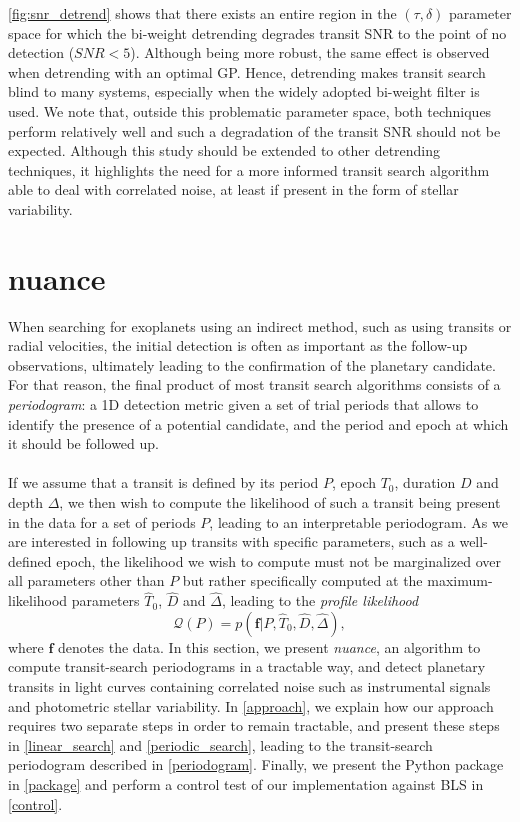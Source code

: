 \documentclass[modern]{aastex631}
\begin{document}
\autoref{fig:snr_detrend} shows that there exists an entire region in the $(\tau, \delta)$ parameter space for which the bi-weight detrending degrades transit SNR to the point of no detection ($SNR < 5$). Although being more robust, the same effect is observed when detrending with an optimal GP. Hence, detrending makes transit search blind to many systems, especially when the widely adopted bi-weight filter is used. We note that, outside this problematic parameter space, both techniques perform relatively well and such a degradation of the transit SNR should not be expected. Although this study should be extended to other detrending techniques, it highlights the need for a more informed transit search algorithm able to deal with correlated noise, at least if present in the form of stellar variability.

\newpage
\section{\textsf{nuance}}\label{nuance}
When searching for exoplanets using an indirect method, such as using transits or radial velocities, the initial detection is often as important as the follow-up observations, ultimately leading to the confirmation of the planetary candidate. For that reason, the final product of most transit search algorithms consists of a \textit{periodogram}: a 1D detection metric given a set of trial periods that allows to identify the presence of a potential candidate, and the period and epoch at which it should be followed up.\\\\ 
If we assume that a transit is defined by its period $P$, epoch $T_0$, duration $D$ and depth $\Delta$, we then wish to compute the likelihood of such a transit being present in the data for a set of periods $P$, leading to an interpretable periodogram. As we are interested in following up transits with specific parameters, such as a well-defined epoch, the likelihood we wish to compute must not be marginalized over all parameters other than $P$ but rather specifically computed at the maximum-likelihood parameters $\hat T_0$, $\hat D$ and $\hat \Delta$, leading to the \textit{profile likelihood}
\begin{equation}\label{eq:periodogram}
       \mathcal{Q}(P) = p(\bm{f} \vert P, \hat T_0 ,\hat D, \hat \Delta),
\end{equation} 
where $\bm{f}$ denotes the data. In this section, we present \textit{nuance}, an algorithm to compute transit-search periodograms in a tractable way, and detect planetary transits in light curves containing correlated noise such as instrumental signals and photometric stellar variability. In \autoref{approach}, we explain how our approach requires two separate steps in order to remain tractable, and present these steps in \autoref{linear_search} and \autoref{periodic_search}, leading to the transit-search periodogram described in \autoref{periodogram}. Finally, we present the \nuancecode{} Python package in \autoref{package} and perform a control test of our implementation against BLS in \autoref{control}.
\end{document}
